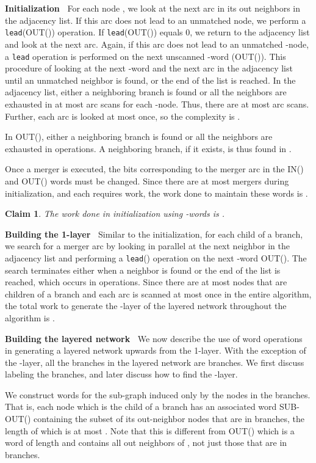 \documentclass{article}
\newtheorem{claim}{Claim}[section]
\begin{document}
{\bf Initialization~} For each node , we look at the next
arc in its out neighbors in the adjacency list. If this arc does not
lead to an unmatched  node, we perform a {\tt
lead}(OUT()) operation. If {\tt lead}(OUT()) equals
0, we return to the adjacency list and look at the next arc. Again, if
this arc does not lead to an unmatched -node, a {\tt lead}
operation is performed on the next unscanned -word
(OUT()). This procedure of looking at the next -word
and the next arc in the adjacency list until an unmatched 
neighbor is found, or the end of the list is reached. In the adjacency
list, either a neighboring  branch is found or all the neighbors
are exhausted in at most  arc scans for each -node. Thus,
there are at most  arc scans. Further, each arc is looked
at most once, so the complexity is .

In OUT(), either a neighboring  branch is found or all the neighbors are exhausted in  operations. A neighboring  branch, if it exists, is thus found in .

Once a merger is executed, the bits corresponding to the merger arc in the IN() and OUT() words must be changed. Since there are at most  mergers during initialization, and each requires  work, the work done to maintain these words is .

\begin{claim}
The work done in initialization using -words is .
\end{claim}

{\bf Building the 1-layer~} Similar to the initialization, for each child  of a  branch, we search for a merger arc by looking in parallel at the next neighbor in the adjacency list and performing a {\tt lead}() operation on the next -word OUT(). The search terminates either when a  neighbor is found or the end of the list is reached, which occurs in  operations. Since there are at most  nodes that are children of a  branch and each arc is scanned at most once in the entire algorithm, the total work to generate the -layer of the layered network throughout the algorithm is .

{\bf Building the layered network~} We now describe the use of word operations in generating a layered network upwards from the 1-layer. With the exception of the -layer, all the branches in the layered network are  branches. We first discuss labeling the  branches, and later discuss how to find the -layer.

We construct words for the sub-graph induced only by the nodes in the  branches. That is, each node  which is the child of a  branch has an associated word SUB-OUT() containing the subset of its out-neighbor nodes that are in  branches, the length of which is at most . Note that this is different from OUT() which is a word of length  and contains all out neighbors of , not just those that are in  branches.
\end{document}
